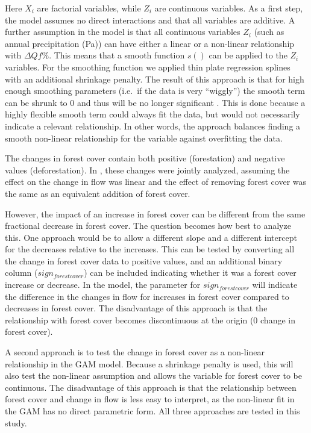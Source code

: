 \documentclass[]{elsarticle} %
\begin{document}
Here \(X_i\) are factorial variables, while \(Z_i\) are continuous variables. As a first step, the model assumes no direct interactions and that all variables are additive. A further assumption in the model is that all continuous variables \(Z_i\) (such as annual precipitation (Pa)) can have either a linear or a non-linear relationship with \(\Delta Qf \%\). This means that a smooth function \(s()\) can be applied to the \(Z_i\) variables. For the smoothing function we applied thin plate regression splines with an additional shrinkage penalty. The result of this approach is that for high enough smoothing parameters (i.e.~if the data is very ``wiggly'') the smooth term can be shrunk to 0 and thus will be no longer significant \citep{wood2006}. This is done because a highly flexible smooth term could always fit the data, but would not necessarily indicate a relevant relationship. In other words, the approach balances finding a smooth non-linear relationship for the variable against overfitting the data.

The changes in forest cover contain both positive (forestation) and negative values (deforestation). In \citet{zhang2017}, these changes were jointly analyzed, assuming the effect on the change in flow was linear and the effect of removing forest cover was the same as an equivalent addition of forest cover.

However, the impact of an increase in forest cover can be different from the same fractional decrease in forest cover. The question becomes how best to analyze this. One approach would be to allow a different slope and a different intercept for the decreases relative to the increases.
This can be tested by converting all the change in forest cover data to positive values, and an additional binary column (\(sign_{forest cover}\)) can be included indicating whether it was a forest cover increase or decrease. In the model, the parameter for \(sign_{forest cover}\) will indicate the difference in the changes in flow for increases in forest cover compared to decreases in forest cover. The disadvantage of this approach is that the relationship with forest cover becomes discontinuous at the origin (0 change in forest cover).

A second approach is to test the change in forest cover as a non-linear relationship in the GAM model. Because a shrinkage penalty is used, this will also test the non-linear assumption and allows the variable for forest cover to be continuous. The disadvantage of this approach is that the relationship between forest cover and change in flow is less easy to interpret, as the non-linear fit in the GAM has no direct parametric form.
All three approaches are tested in this study.
\end{document}
